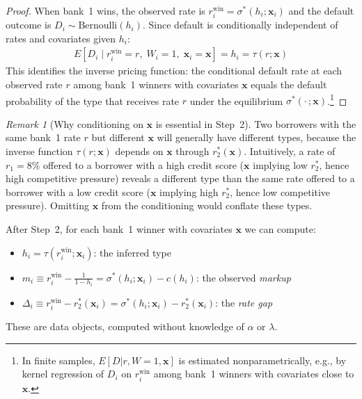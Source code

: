 \documentclass[12pt]{article}
\theoremstyle{plain}
\theoremstyle{plain}
\theoremstyle{definition}  %
\theoremstyle{remark}  %
\newtheorem{remark}[thm]{Remark}  %
\begin{document}
\begin{proof}
When bank~1 wins, the observed rate is $r_i^{\text{win}} = \sigma^*(h_i; \mathbf{x}_i)$ and the default outcome is $D_i \sim \text{Bernoulli}(h_i)$. Since default is conditionally independent of rates and covariates given $h_i$:
\begin{align}\label{eq:id_h_from_D}
    E[D_i \mid r_i^{\text{win}} = r,\; W_i = 1,\; \mathbf{x}_i = \mathbf{x}] = h_i = \tau(r; \mathbf{x})
\end{align}
This identifies the inverse pricing function: the conditional default rate at each observed rate $r$ among bank~1 winners with covariates $\mathbf{x}$ equals the default probability of the type that receives rate $r$ under the equilibrium $\sigma^*(\cdot\,; \mathbf{x})$.\footnote{In finite samples, $E[D|r, W\!=\!1, \mathbf{x}]$ is estimated nonparametrically, e.g., by kernel regression of $D_i$ on $r_i^{\text{win}}$ among bank~1 winners with covariates close to $\mathbf{x}$.}
\end{proof}

\begin{remark}[Why conditioning on $\mathbf{x}$ is essential in Step~2]\label{rem:x_essential}
Two borrowers with the same bank~1 rate $r$ but different $\mathbf{x}$ will generally have different types, because the inverse function $\tau(r; \mathbf{x})$ depends on $\mathbf{x}$ through $r_2^*(\mathbf{x})$. Intuitively, a rate of $r_1 = 8\%$ offered to a borrower with a high credit score ($\mathbf{x}$ implying low $r_2^*$, hence high competitive pressure) reveals a different type than the same rate offered to a borrower with a low credit score ($\mathbf{x}$ implying high $r_2^*$, hence low competitive pressure). Omitting $\mathbf{x}$ from the conditioning would conflate these types.
\end{remark}

\medskip\noindent
After Step~2, for each bank~1 winner with covariates $\mathbf{x}$ we can compute:
\begin{itemize}
    \item $h_i = \tau(r_i^{\text{win}}; \mathbf{x}_i)$: the inferred type
    \item $m_i \equiv r_i^{\text{win}} - \frac{1}{1-h_i} = \sigma^*(h_i;\mathbf{x}_i) - c(h_i)$: the observed \emph{markup}
    \item $\Delta_i \equiv r_i^{\text{win}} - r_2^*(\mathbf{x}_i) = \sigma^*(h_i;\mathbf{x}_i) - r_2^*(\mathbf{x}_i)$: the \emph{rate gap}
\end{itemize}
These are data objects, computed without knowledge of $\alpha$ or $\lambda$.
\end{document}
